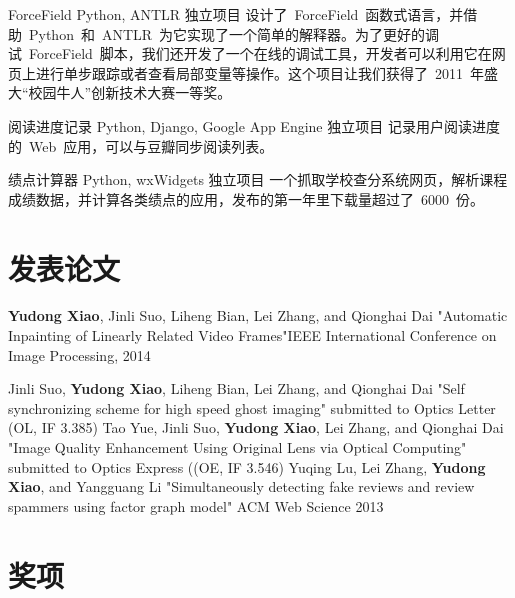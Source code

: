 \documentclass[11pt,a4paper]{moderncv}
\begin{document}
\vspace*{0.2\baselineskip}
{ForceField}
{Python, ANTLR}
{独立项目}{}
{设计了~ForceField~函数式语言，并借助~Python~和~ANTLR~为它实现了一个简单的解释器。为了更好的调试~ForceField~脚本，我们还开发了一个在线的调试工具，开发者可以利用它在网页上进行单步跟踪或者查看局部变量等操作。这个项目让我们获得了~2011~年盛大``校园牛人''创新技术大赛一等奖。}

\vspace*{0.2\baselineskip}
{阅读进度记录}
{Python, Django, Google App Engine}
{独立项目}{}
{记录用户阅读进度的~Web~应用，可以与豆瓣同步阅读列表。}

\vspace*{0.2\baselineskip}
{绩点计算器}
{Python, wxWidgets}
{独立项目}{}
{一个抓取学校查分系统网页，解析课程成绩数据，并计算各类绩点的应用，发布的第一年里下载量超过了~6000~份。}

\renewcommand{\baselinestretch}{1.0}

\section{发表论文}
{\textbf{Yudong Xiao}\textnormal{, Jinli Suo, Liheng Bian, Lei Zhang, and Qionghai Dai}}
{"Automatic Inpainting of Linearly Related Video Frames"}{IEEE International Conference on Image Processing, 2014}
{}{}{}

{\textnormal{Jinli Suo, }\textbf{Yudong Xiao}\textnormal{, Liheng Bian, Lei Zhang, and Qionghai Dai}}
{"Self synchronizing scheme for high speed ghost imaging"}
{submitted to Optics Letter (OL, IF 3.385)}
{}{}{}
{\textnormal{Tao Yue, Jinli Suo, }\textbf{Yudong Xiao}\textnormal{, Lei Zhang, and Qionghai Dai}}
{"Image Quality Enhancement Using Original Lens via Optical Computing"}
{submitted to  Optics Express ((OE, IF 3.546)}
{}{}{}
{\textnormal{Yuqing Lu, Lei Zhang, }\textbf{Yudong Xiao}\textnormal{, and Yangguang Li}}
{"Simultaneously detecting fake reviews and review spammers using factor graph model"}
{ACM Web Science 2013}
{}{}{}


\section{奖项}
\end{document}

